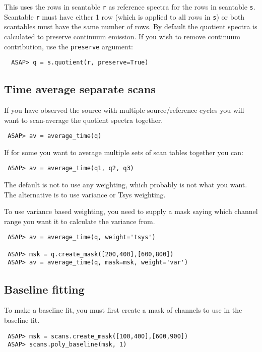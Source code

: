 \documentclass[11pt]{article}
\newcommand{\cmd}[1]{{\tt #1}}
\begin{document}
This uses the rows in scantable \cmd{r} as reference spectra for the
rows in scantable \cmd{s}. Scantable \cmd{r} must have either 1 row
(which is applied to all rows in \cmd{s}) or both scantables must have
the same number of rows. By default the quotient spectra is calculated
to preserve continuum emission. If you wish to remove continuum
contribution, use the \cmd{preserve} argument:

\begin{verbatim}
  ASAP> q = s.quotient(r, preserve=True)
\end{verbatim}

\subsection{Time average separate scans}

If you have observed the source with multiple source/reference cycles you
will want to scan-average the quotient spectra together.

\begin{verbatim}
 ASAP> av = average_time(q)
\end{verbatim}

If for some you want to average multiple sets of scan tables together you can:

\begin{verbatim}
 ASAP> av = average_time(q1, q2, q3)
\end{verbatim}

The default is not to use any weighting, which probably is not what
you want. The alternative is to use variance or Tsys weighting.

To use variance based weighting, you need to supply a mask saying which
channel range you want it to calculate the variance from.

\begin{verbatim}
 ASAP> av = average_time(q, weight='tsys')

 ASAP> msk = q.create_mask([200,400],[600,800])
 ASAP> av = average_time(q, mask=msk, weight='var')
\end{verbatim}

\subsection{Baseline fitting}

To make a baseline fit, you must first create a mask of channels to
use in the baseline fit. 

\begin{verbatim}
 ASAP> msk = scans.create_mask([100,400],[600,900])
 ASAP> scans.poly_baseline(msk, 1) 
\end{verbatim}
\end{document}
